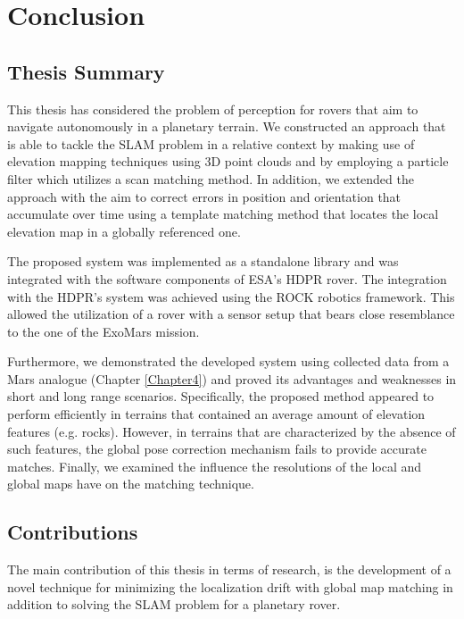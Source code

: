 \label{Chapter5}

\chapter{Conclusion}

\section{Thesis Summary}

This thesis has considered the problem of perception for rovers that
aim to navigate autonomously in a planetary terrain.
We constructed an approach that is able to tackle the SLAM problem
in a relative context by making use of elevation mapping techniques using
3D point clouds and by employing a particle filter which utilizes a
scan matching method.
In addition, we extended the approach with the aim to correct errors
in position and orientation that accumulate over time using a template
matching method that locates the local elevation map in a globally referenced
one.

The proposed system was implemented as a standalone library and was
integrated with the software components of ESA's HDPR rover.
The integration with the HDPR's system was achieved using the ROCK
robotics framework.
This allowed the utilization of a rover with a sensor setup that bears close
resemblance to the one of the ExoMars mission.

Furthermore, we demonstrated the developed system using collected data
from a Mars analogue (Chapter \ref{Chapter4}) and proved its
advantages and weaknesses in short and long range scenarios.
Specifically, the proposed method appeared to perform efficiently in
terrains that contained an average amount of elevation features (e.g. rocks).
However, in terrains that are characterized by the absence of such features,
the global pose correction mechanism fails to provide accurate matches.
Finally, we examined the influence the resolutions of the local and global
maps have on the matching technique.

\section{Contributions}

The main contribution of this thesis in terms of research,
is the development of a novel technique for minimizing the localization
drift with global map matching in addition to solving the SLAM problem
for a planetary rover.

